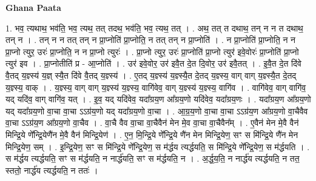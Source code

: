 \documentclass[17pt]{extarticle}
\begin{document}
\textbf{Ghana Paata } \newline

1. भव॒ त्यथाथ॒ भव॑ति॒ भव॒ त्यथ॒ तत् तदथ॒ भव॑ति॒ भव॒ त्यथ॒ तत् । . अथ॒ तत् त दथाथ॒ तन् न न त दथाथ॒ तन् न । . तन् न न तत् तन् न प्रा॒प्नोति॑ प्रा॒प्नोति॒ न तत् तन् न प्रा॒प्नोति॑ । . न प्रा॒प्नोति॑ प्रा॒प्नोति॒ न न प्रा॒प्नो त्युर॒ उरः॑ प्रा॒प्नोति॒ न न प्रा॒प्नो त्युरः॑ । . प्रा॒प्नो त्युर॒ उरः॑ प्रा॒प्नोति॑ प्रा॒प्नो त्युर॑ इवे॒वोरः॑ प्रा॒प्नोति॑ प्रा॒प्नो त्युर॑ इव । . प्रा॒प्नोतीति॑ प्र - आ॒प्नोति॑ । . उर॑ इवे॒वोर॒ उर॑ इवै॒त दे॒त दि॒वोर॒ उर॑ इवै॒तत् । . इ॒वै॒त दे॒त दि॑वे वै॒तद् य॒ज्ञ्स्य॑ य॒ज्ञ् स्यै॒त दि॑वे वै॒तद् य॒ज्ञ्स्य॑ । . ए॒तद् य॒ज्ञ्स्य॑ य॒ज्ञ्स्यै॒त दे॒तद् य॒ज्ञ्स्य॒ वाग् वाग् य॒ज्ञ्स्यै॒त दे॒तद् य॒ज्ञ्स्य॒ वाक् । . य॒ज्ञ्स्य॒ वाग् वाग् य॒ज्ञ्स्य॑ य॒ज्ञ्स्य॒ वागि॑वेव॒ वाग् य॒ज्ञ्स्य॑ य॒ज्ञ्स्य॒ वागि॑व । . वागि॑वेव॒ वाग् वागि॑व॒ यद् यदि॑व॒ वाग् वागि॑व॒ यत् । . इ॒व॒ यद् यदि॑वेव॒ यदा᳚ग्रय॒ण आ᳚ग्रय॒णो यदि॑वेव॒ यदा᳚ग्रय॒णः । . यदा᳚ग्रय॒ण आ᳚ग्रय॒णो यद् यदा᳚ग्रय॒णो वा॒चा वा॒चा ऽऽग्र॑य॒णो यद् यदा᳚ग्रय॒णो वा॒चा । . आ॒ग्र॒य॒णो वा॒चा वा॒चा ऽऽग्र॑य॒ण आ᳚ग्रय॒णो वा॒चैवैव वा॒चा ऽऽग्र॑य॒ण आ᳚ग्रय॒णो वा॒चैव । . वा॒चै वैव वा॒चा वा॒चैवैन॑ मेन मे॒व वा॒चा वा॒चैवैन᳚म् । . ए॒वैन॑ मेन मे॒वै वैन॑ मिन्द्रि॒ये णे᳚न्द्रि॒येणै॑न मे॒वै वैन॑ मिन्द्रि॒येण॑ । . ए॒न॒ मि॒न्द्रि॒ये णे᳚न्द्रि॒ये णै॑न मेन मिन्द्रि॒येण॒ सꣳ स मि॑न्द्रि॒ये णै॑न मेन मिन्द्रि॒येण॒ सम् । . इ॒न्द्रि॒येण॒ सꣳ स मि॑न्द्रि॒ये णे᳚न्द्रि॒येण॒ स म॑र्द्धय त्यर्द्धयति॒ स मि॑न्द्रि॒ये णे᳚न्द्रि॒येण॒ स म॑र्द्धयति । . स म॑र्द्धय त्यर्द्धयति॒ सꣳ स म॑र्द्धयति॒ न नार्द्ध॑यति॒ सꣳ स म॑र्द्धयति॒ न । . अ॒र्द्ध॒य॒ति॒ न नार्द्ध॑य त्यर्द्धयति॒ न तत॒ स्ततो॒ नार्द्ध॑य त्यर्द्धयति॒ न ततः॑ । \newline
\end{document}
